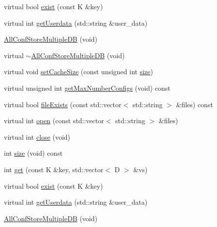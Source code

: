 \begin{DoxyCompactItemize}
\item 
virtual bool \mbox{\hyperlink{classFILEDB_1_1AllConfStoreMultipleDB_a5c9333af45c37c53c863ad2a07a9843b}{exist}} (const K \&key)
\item 
virtual int \mbox{\hyperlink{classFILEDB_1_1AllConfStoreMultipleDB_a9a314fba1056c35ffe54e35e98e83523}{get\+Userdata}} (std\+::string \&user\+\_\+data)
\item 
\mbox{\hyperlink{classFILEDB_1_1AllConfStoreMultipleDB_a0c45fce64168ca576e875747eb599927}{All\+Conf\+Store\+Multiple\+DB}} (void)
\item 
virtual \mbox{\hyperlink{classFILEDB_1_1AllConfStoreMultipleDB_a88489be8d488c6fe3a88312f200e7fdd}{$\sim$\+All\+Conf\+Store\+Multiple\+DB}} (void)
\item 
virtual void \mbox{\hyperlink{classFILEDB_1_1AllConfStoreMultipleDB_a746ef51b2dedf529a8e85528c0d31bfc}{set\+Cache\+Size}} (const unsigned int \mbox{\hyperlink{classFILEDB_1_1AllConfStoreMultipleDB_af05105b1ffe17093556a209ac9db1ed9}{size}})
\item 
virtual unsigned int \mbox{\hyperlink{classFILEDB_1_1AllConfStoreMultipleDB_a9348ec8716b4c716df67dca608bb1bde}{get\+Max\+Number\+Configs}} (void) const
\item 
virtual bool \mbox{\hyperlink{classFILEDB_1_1AllConfStoreMultipleDB_aa5a7c38b3785226da6f30a4ab5e51428}{file\+Exists}} (const std\+::vector$<$ std\+::string $>$ \&files) const
\item 
virtual int \mbox{\hyperlink{classFILEDB_1_1AllConfStoreMultipleDB_aa006283e8d6f0f079ca234c369f53679}{open}} (const std\+::vector$<$ std\+::string $>$ \&files)
\item 
virtual int \mbox{\hyperlink{classFILEDB_1_1AllConfStoreMultipleDB_a71aed1deeb31450afee4b692941dbae1}{close}} (void)
\item 
int \mbox{\hyperlink{classFILEDB_1_1AllConfStoreMultipleDB_af05105b1ffe17093556a209ac9db1ed9}{size}} (void) const
\item 
int \mbox{\hyperlink{classFILEDB_1_1AllConfStoreMultipleDB_a3a9858458bf0ecc76133e1c448568cf5}{get}} (const K \&key, std\+::vector$<$ D $>$ \&vs)
\item 
virtual bool \mbox{\hyperlink{classFILEDB_1_1AllConfStoreMultipleDB_a5c9333af45c37c53c863ad2a07a9843b}{exist}} (const K \&key)
\item 
virtual int \mbox{\hyperlink{classFILEDB_1_1AllConfStoreMultipleDB_a9a314fba1056c35ffe54e35e98e83523}{get\+Userdata}} (std\+::string \&user\+\_\+data)
\item 
\mbox{\hyperlink{classFILEDB_1_1AllConfStoreMultipleDB_a0c45fce64168ca576e875747eb599927}{All\+Conf\+Store\+Multiple\+DB}} (void)

\end{DoxyCompactItemize}
